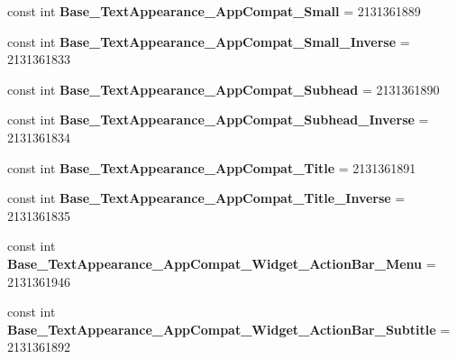 \begin{DoxyCompactItemize}
\item 
\mbox{\label{classXaria_1_1Resource_1_1Style_acea2aec52811af6dfbe141aea208cc94}} 
const int {\bfseries Base\+\_\+\+Text\+Appearance\+\_\+\+App\+Compat\+\_\+\+Small} = 2131361889
\item 
\mbox{\label{classXaria_1_1Resource_1_1Style_aaedf793011cc3ce8916057b1b6621220}} 
const int {\bfseries Base\+\_\+\+Text\+Appearance\+\_\+\+App\+Compat\+\_\+\+Small\+\_\+\+Inverse} = 2131361833
\item 
\mbox{\label{classXaria_1_1Resource_1_1Style_aa5d5c0ffe36ca78926a77bc64a11b1cd}} 
const int {\bfseries Base\+\_\+\+Text\+Appearance\+\_\+\+App\+Compat\+\_\+\+Subhead} = 2131361890
\item 
\mbox{\label{classXaria_1_1Resource_1_1Style_a3e6acbfc7bbac9a4f8f888893f3e69a1}} 
const int {\bfseries Base\+\_\+\+Text\+Appearance\+\_\+\+App\+Compat\+\_\+\+Subhead\+\_\+\+Inverse} = 2131361834
\item 
\mbox{\label{classXaria_1_1Resource_1_1Style_ad0e860d46a84a520dfbbd5d88fc1c9f0}} 
const int {\bfseries Base\+\_\+\+Text\+Appearance\+\_\+\+App\+Compat\+\_\+\+Title} = 2131361891
\item 
\mbox{\label{classXaria_1_1Resource_1_1Style_a04d8fa4ded9c32db4b9bdb05630001b9}} 
const int {\bfseries Base\+\_\+\+Text\+Appearance\+\_\+\+App\+Compat\+\_\+\+Title\+\_\+\+Inverse} = 2131361835
\item 
\mbox{\label{classXaria_1_1Resource_1_1Style_a3490360fdf1f807d2275c04fb70aafbf}} 
const int {\bfseries Base\+\_\+\+Text\+Appearance\+\_\+\+App\+Compat\+\_\+\+Widget\+\_\+\+Action\+Bar\+\_\+\+Menu} = 2131361946
\item 
\mbox{\label{classXaria_1_1Resource_1_1Style_a4cc6115d8955fa3e31ede42185797ff7}} 
const int {\bfseries Base\+\_\+\+Text\+Appearance\+\_\+\+App\+Compat\+\_\+\+Widget\+\_\+\+Action\+Bar\+\_\+\+Subtitle} = 2131361892
\item 
\mbox{\label{classXaria_1_1Resource_1_1Style_a891dd76346ac2943d631234b056b4cc2}} 

\end{DoxyCompactItemize}
